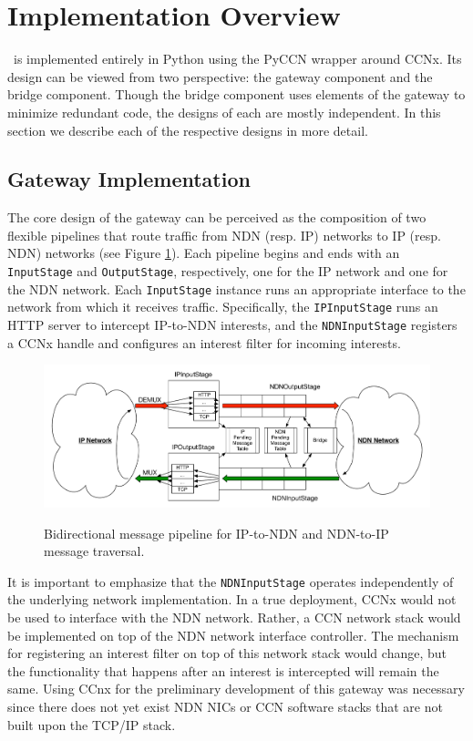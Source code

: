 \section{Implementation Overview}
\sink\ is implemented entirely in Python using the PyCCN \cite{pyccn} wrapper around CCNx. Its design can be viewed from two perspective: the gateway component and the bridge component. Though the bridge component uses elements of the gateway to minimize redundant code, the designs of each are mostly independent. In this section we describe each of the respective designs in more detail. 

\subsection{Gateway Implementation}
The core design of the gateway can be perceived as the composition of two flexible pipelines that route traffic from NDN (resp. IP) networks to IP (resp. NDN) networks (see Figure \ref{fig:pipeline}). Each pipeline begins and ends with an {\tt InputStage} and {\tt OutputStage}, respectively, one for the IP network and one for the NDN network. Each {\tt InputStage} instance runs an appropriate interface to the network from which it receives traffic. Specifically, the {\tt IPInputStage} runs an HTTP server to intercept IP-to-NDN interests, and the {\tt NDNInputStage} registers a CCNx handle and configures an interest filter for incoming interests. 

\begin{figure}[ht!]
\begin{center}
\includegraphics[scale=0.45]{./images/pipeline.pdf}
\label{fig:pipeline}
\caption{Bidirectional message pipeline for IP-to-NDN and NDN-to-IP message traversal.}
\end{center}
\end{figure}

It is important to emphasize that the {\tt NDNInputStage} operates independently of the underlying network implementation. In a true deployment, CCNx would not be used to interface with the NDN network. Rather, a CCN network stack would be implemented on top of the NDN network interface controller. The mechanism for registering an interest filter on top of this network stack would change, but the functionality that happens after an interest is intercepted will remain the same. Using CCnx for the preliminary development of this gateway was necessary since there does not yet exist NDN NICs or CCN software stacks that are not built upon the TCP/IP stack.

